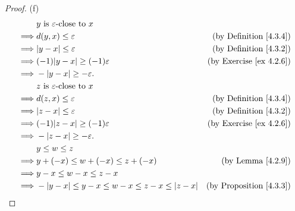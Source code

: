 \begin{proof}{(f)}
    \begin{align*}
                 & y \text{ is } \varepsilon\text{-close to } x                                                                        \\
        \implies & d(y, x) \leq \varepsilon                                                      & \text{(by Definition \ref{4.3.4})}  \\
        \implies & \abs*{y - x} \leq \varepsilon                                                 & \text{(by Definition \ref{4.3.2})}  \\
        \implies & (-1)\abs*{y - x} \geq (-1)\varepsilon                                         & \text{(by Exercise \ref{ex 4.2.6})} \\
        \implies & -\abs*{y - x} \geq -\varepsilon.                                                                                    \\
                 & z \text{ is } \varepsilon\text{-close to } x                                                                        \\
        \implies & d(z, x) \leq \varepsilon                                                      & \text{(by Definition \ref{4.3.4})}  \\
        \implies & \abs*{z - x} \leq \varepsilon                                                 & \text{(by Definition \ref{4.3.2})}  \\
        \implies & (-1)\abs*{z - x} \geq (-1)\varepsilon                                         & \text{(by Exercise \ref{ex 4.2.6})} \\
        \implies & -\abs*{z - x} \geq -\varepsilon.                                                                                    \\
                 & y \leq w \leq z                                                                                                     \\
        \implies & y + (-x) \leq w + (-x) \leq z + (-x)                                          & \text{(by Lemma \ref{4.2.9})}       \\
        \implies & y - x \leq w - x \leq z - x                                                                                         \\
        \implies & -\abs*{y - x} \leq y - x \leq w - x \leq z - x \leq \abs*{z - x}              & \text{(by Proposition \ref{4.3.3})} \\

\end{align*}
\end{proof}
